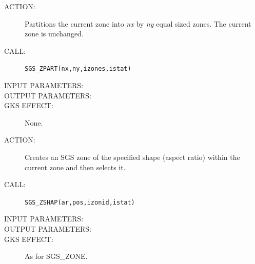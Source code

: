 \documentclass[11pt]{article}
\begin{document}
\begin{description}
\item [ACTION:]
Partitions the current zone into {\em nx}\/ by {\em ny}\/ equal sized zones.
The current zone is unchanged.
\item [CALL:]
{\tt SGS\_ZPART(nx,ny,izones,istat)}
\item [INPUT PARAMETERS:]
\begin{params}
\end{params}
\item [OUTPUT PARAMETERS:]
\begin{params}
\end{params}
\item [GKS EFFECT:]
None.
\end{description}
\goodbreak

\begin{description}
\item [ACTION:]
Creates an SGS zone of the specified shape (aspect ratio) within the current
zone and then selects it.
\item [CALL:]
{\tt SGS\_ZSHAP(ar,pos,izonid,istat)}
\item [INPUT PARAMETERS:]
\begin{params}
\end{params}
\item [OUTPUT PARAMETERS:]
\begin{params}
\end{params}
\item [GKS EFFECT:]
As for SGS\_ZONE.
\end{description}
\goodbreak
\end{document}
